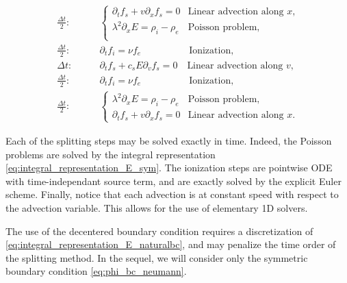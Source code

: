 \documentclass{article}
\numberwithin{equation}{section}
\newcommand{\todo}[1]{{\color{red}\textbf{#1}}}
\begin{document}
\begin{align*}
	\frac{\Delta t}{2}: \quad\quad&
	\begin{cases}
		\partial_t f_s + v \partial_x f_s = 0 & \text{Linear advection along $x$,} \\
		\lambda^2 \partial_x E = \rho_i - \rho_e & \text{Poisson problem,} \\
	\end{cases} \\
	\frac{\Delta t}{2}: \quad\quad&
	\partial_t f_i = \nu f_e \quad\quad\quad\quad\quad \text{Ionization,} \\
	\Delta t: \quad\quad&
	\partial_t f_s + c_s E \partial_v f_s = 0 \quad \text{Linear advection along $v$,} \\
	\frac{\Delta t}{2}: \quad\quad&
	\partial_t f_i = \nu f_e \quad\quad\quad\quad\quad \text{Ionization,} \\
	\frac{\Delta t}{2}: \quad\quad&
	\begin{cases}
		\lambda^2 \partial_x E = \rho_i - \rho_e & \text{Poisson problem,}\\
		\partial_t f_s + v \partial_x f_s = 0 & \text{Linear advection along $x$.}
	\end{cases} 
\end{align*}



Each of the splitting steps may be solved exactly in time.
Indeed, the Poisson problems are solved by the integral representation \cref{eq:integral_representation_E_sym}. The ionization steps are pointwise ODE with time-independant source term, and are exactly solved by the explicit Euler scheme. Finally, notice that each advection is at constant speed with respect to the advection variable. This allows for the use of elementary 1D solvers.  

The use of the decentered boundary condition requires a discretization of \cref{eq:integral_representation_E_naturalbc}, and may penalize the time order of the splitting method. In the sequel, we will consider only the symmetric boundary condition \cref{eq:phi_bc_neumann}.
\end{document}
